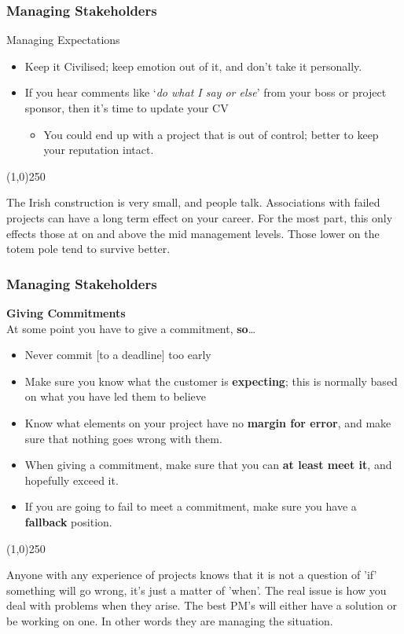 \begin{frame}
\frametitle{Managing Stakeholders}
Managing Expectations\\
\begin{itemize}
	\item Keep it Civilised; keep emotion out of it, and don't take it personally.
	\item If you hear comments like `\textit{do what I say or else}' from your boss or project sponsor, then it's time to update your CV
		\begin{itemize}
			\item You could end up with a project that is out of control; better to keep your reputation intact.
		\end{itemize}
\end{itemize}
\end{frame}
\begin{center}\line(1,0){250}\end{center}
The Irish construction is very small, and people talk.  Associations with failed projects can have a long term effect on your career.  For the most part, this only effects those at on and above the mid management levels.  Those lower on the totem pole tend to survive better.




\begin{frame}
\frametitle{Managing Stakeholders}
\textbf{Giving Commitments}\\
At some point you have to give a commitment, \textbf{so}\dots
\begin{itemize}
\item Never commit [to a deadline] too early
\item Make sure you know what the customer is \textbf{expecting}; this is normally based on what you have led them to believe
\item Know what elements on your project have no \textbf{margin for error}, and make sure that nothing goes wrong with them.
\item When giving a commitment, make sure that you can \textbf{at least meet it}, and hopefully exceed it.
\item If you are going to fail to meet a commitment, make sure you have a \textbf{fallback} position.
\end{itemize}
\end{frame}
\begin{center}\line(1,0){250}\end{center}
Anyone with any experience of projects knows that it is not a question of 'if' something will go wrong, it's just a matter of 'when'.  The real issue is how you deal with problems when they arise.  The best PM's will either have a solution or be working on one.  In other words they are managing the situation.


